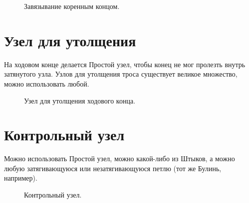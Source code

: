\documentclass{artikel1}
\begin{document}
\begin{figure}[H]\centering
	\begin{minipage}{1\linewidth}
		\begin{center}
			\tcbox[enhanced jigsaw,colframe=black,opacityframe=0.5,opacityback=0.5]
			{\centering{}}
		\end{center}
	\end{minipage}
\caption{Завязывание коренным концом.}
\label{ris:Besedochny_marka_sposob}
\end{figure}

\section{Узел для утолщения}

На ходовом конце делается Простой узел, чтобы конец не мог пролезть внутрь затянутого узла. Узлов для утолщения троса существует великое множество, можно использовать любой.

\begin{figure}[H]\centering
	\begin{minipage}{1\linewidth}
		\begin{center}
			\tcbox[enhanced jigsaw,colframe=black,opacityframe=0.5,opacityback=0.5]
			{\centering{}}
		\end{center}
	\end{minipage}
\caption{Узел для утолщения ходового конца.}
\label{ris:Besedochny_utolsh}
\end{figure}

\section{Контрольный узел}

Можно использовать Простой узел, можно какой-либо из Штыков, а можно любую затягивающуюся или незатягивающуюся петлю (тот же Булинь, например).

\begin{figure}[H]\centering
\hfill
	\caption{Контрольный узел.}\label{ris:Besedochny_kontrol}
\end{figure}
\end{document}
